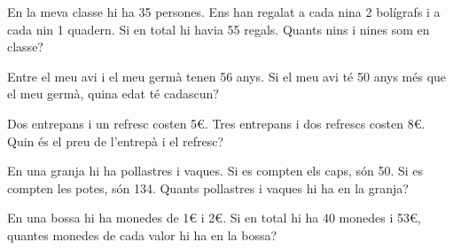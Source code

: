 \begin{activitats}
\begin{mylist}
\exer  En la meva classe hi ha 35 persones. Ens han regalat a cada nina 2 bolígrafs i a cada nin 1 quadern. Si en total hi havia 55 regals. Quants nins i nines som en classe?

\exer  Entre el meu avi i el meu germà tenen 56 anys. Si el meu avi té 50 anys més que el meu germà, quina edat té cadascun?

\exer  Dos entrepans i un refresc costen 5€. Tres entrepans i dos refrescs costen 8€. Quin és el preu de l'entrepà i el refresc?

\exer  En una granja hi ha pollastres i vaques. Si es compten els caps, són 50. Si es compten les potes, són 134. Quants pollastres i vaques hi ha en la granja?


\exer  En una bossa hi ha monedes de 1€ i 2€. Si en total hi ha 40 monedes i 53€, quantes monedes de cada valor hi ha en la bossa?


\end{mylist}
\end{activitats}
